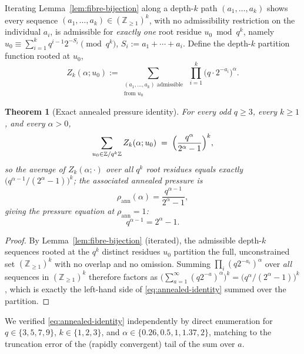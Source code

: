\documentclass[11pt]{article}
\newtheorem{theorem}{Theorem}[section]
\theoremstyle{remark}
\begin{document}
Iterating Lemma~\ref{lem:fibre-bijection} along a depth-$k$ path
$(a_1,\dots,a_k)$ shows every sequence $(a_1,\dots,a_k)\in
(\mathbb{Z}_{\ge1})^k$, with no admissibility restriction on the
individual $a_i$, is admissible for \emph{exactly one} root residue
$u_0\bmod q^k$, namely
$u_0\equiv\sum_{i=1}^k q^{i-1}2^{-S_i}\pmod{q^k}$, $S_i:=a_1+\cdots+a_i$.
Define the depth-$k$ partition function rooted at $u_0$,
\[
  Z_k(\alpha;u_0) := \sum_{\substack{(a_1,\dots,a_k)\text{ admissible}\\ \text{from } u_0}} \ \prod_{i=1}^k \bigl(q\cdot2^{-a_i}\bigr)^\alpha .
\]

\begin{theorem}[Exact annealed pressure identity]\label{thm:pressure}
For every odd $q\ge3$, every $k\ge1$, and every $\alpha>0$,
\begin{equation}\label{eq:annealed-identity}
  \sum_{u_0\in\mathbb{Z}/q^k\mathbb{Z}} Z_k(\alpha;u_0) \;=\; \Bigl(\frac{q^\alpha}{2^\alpha-1}\Bigr)^{k},
\end{equation}
so the \emph{average} of $Z_k(\alpha;\cdot)$ over all $q^k$ root
residues equals exactly $\bigl(q^{\alpha-1}/(2^\alpha-1)\bigr)^k$; the
associated annealed pressure is
\begin{equation}\label{eq:pressure-closed-form}
  \rho_{\mathrm{ann}}(\alpha) = \frac{q^{\alpha-1}}{2^\alpha-1},
\end{equation}
giving the pressure equation at $\rho_{\mathrm{ann}}=1$:
\begin{equation}\label{eq:pressure-eq}
  q^{\alpha-1} = 2^{\alpha}-1.
\end{equation}
\end{theorem}
\begin{proof}
By Lemma~\ref{lem:fibre-bijection} (iterated), the admissible depth-$k$
sequences rooted at the $q^k$ distinct residues $u_0$ partition the
full, unconstrained set $(\mathbb{Z}_{\ge1})^k$ with no overlap and no
omission. Summing $\prod_i(q2^{-a_i})^\alpha$ over \emph{all} sequences
in $(\mathbb{Z}_{\ge1})^k$ therefore factors as
$\bigl(\sum_{a=1}^\infty (q2^{-a})^\alpha\bigr)^k =
\bigl(q^\alpha/(2^\alpha-1)\bigr)^k$, which is exactly the left-hand
side of \eqref{eq:annealed-identity} summed over the partition.
\end{proof}

We verified \eqref{eq:annealed-identity} independently by direct
enumeration for $q\in\{3,5,7,9\}$, $k\in\{1,2,3\}$, and
$\alpha\in\{0.26,0.5,1,1.37,2\}$, matching to the truncation error of
the (rapidly convergent) tail of the sum over $a$.
\end{document}
